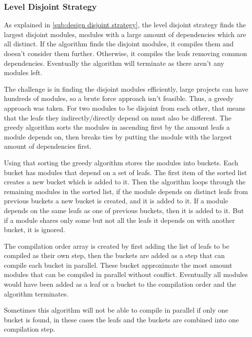 \subsubsection{Level Disjoint Strategy} \label{sub:imp disj strategy}

As explained in \cref{sub:design disjoint strategy}, the level disjoint
strategy finds the largest disjoint modules, modules with a large amount of
dependencies which are all distinct. If the algorithm finds the disjoint
modules, it compiles them and doesn't consider them further. Otherwise, it
compiles the leafs removing common dependencies. Eventually the algorithm will
terminate as there aren't any modules left.

The challenge is in finding the disjoint modules efficiently, large projects
can have hundreds of modules, so a brute force approach isn't feasible. Thus, a
greedy approach was taken. For two modules to be disjoint from each other, that
means that the leafs they indirectly/directly depend on must also be different.
The greedy algorithm sorts the modules in ascending first by the amount leafs a
module depends on, then breaks ties by putting the module with the largest
amount of  dependencies first.

Using that sorting the greedy algorithm stores the modules into buckets. Each
bucket has modules that depend on a set of leafs. The first item of the sorted
list creates a new bucket which is added to it. Then the algorithm loops through
the remaining modules in the sorted list, if the module depends on distinct leafs
from previous buckets a new bucket is created, and it is added to it. If a
module depends on the same leafs as one of previous buckets, then it is added to it.
But if a module shares only some but not all the leafs it depends on with
another bucket, it is ignored.

The compilation order array is created by first adding the list of leafs to be
compiled as their own step, then the buckets are added as a step that can
compile each bucket in parallel. These bucket approximate the most amount
modules that can be compiled in parallel without conflict. Eventually all
modules would have been added as a leaf or a bucket to the compilation order
and the algorithm terminates.

Sometimes this algorithm will not be able to compile in parallel if only one
bucket is found, in these cases the leafs and the buckets are combined into one
compilation step.

